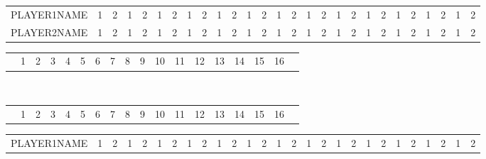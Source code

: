 \begin{table}
\begin{tabular}{p{5cm}|c|c|c|c|c|c|c|c|c|c|c|c|c|c|c|c|c|c|c|c|c|c|c|c|c|c|}
\cline{2-27}
PLAYER1NAME & \footnotesize 1 & \footnotesize 2 & \footnotesize 1 & \footnotesize 2 & \footnotesize 1 & \footnotesize 2 & \footnotesize 1 & \footnotesize 2 & \footnotesize 1 & \footnotesize 2 & \footnotesize 1 & \footnotesize 2 & \footnotesize 1 & \footnotesize 2 & \footnotesize 1 & \footnotesize 2 & \footnotesize 1 & \footnotesize 2 & \footnotesize 1 & \footnotesize 2 & \footnotesize 1 & \footnotesize 2 & \footnotesize 1 & \footnotesize 2 & \footnotesize 1 & \footnotesize 2 \\
\cline{1-27}
\cline{1-27}
PLAYER2NAME & \footnotesize 1 & \footnotesize 2 & \footnotesize 1 & \footnotesize 2 & \footnotesize 1 & \footnotesize 2 & \footnotesize 1 & \footnotesize 2 & \footnotesize 1 & \footnotesize 2 & \footnotesize 1 & \footnotesize 2 & \footnotesize 1 & \footnotesize 2 & \footnotesize 1 & \footnotesize 2 & \footnotesize 1 & \footnotesize 2 & \footnotesize 1 & \footnotesize 2 & \footnotesize 1 & \footnotesize 2 & \footnotesize 1 & \footnotesize 2 & \footnotesize 1 & \footnotesize 2 \\
\cline{2-27}
\end{tabular}
\begin{tabular}{p{5cm}|c|c|c|c|c|c!{\vrule width 2pt}c|c|c|c|c|c|c|c|c|c!{\vrule width 3pt}p{1cm}!{\vrule width 3pt}}
& 1 & 2 & 3 & 4 & 5 & 6 & 7 & 8 & 9 & 10 & 11 & 12 & 13 & 14 & 15 & 16 & \\
\end{tabular}
~\\
\begin{tabular}{p{5cm}|c|c|c|c|c|c!{\vrule width 2pt}c|c|c|c|c|c|c|c|c|c!{\vrule width 3pt}p{1cm}!{\vrule width 3pt}}
& 1 & 2 & 3 & 4 & 5 & 6 & 7 & 8 & 9 & 10 & 11 & 12 & 13 & 14 & 15 & 16 & \\
\end{tabular}
\begin{tabular}{p{5cm}|c|c|c|c|c|c|c|c|c|c|c|c|c|c|c|c|c|c|c|c|c|c|c|c|c|c|}
\cline{2-27}
PLAYER1NAME & \footnotesize 1 & \footnotesize 2 & \footnotesize 1 & \footnotesize 2 & \footnotesize 1 & \footnotesize 2 & \footnotesize 1 & \footnotesize 2 & \footnotesize 1 & \footnotesize 2 & \footnotesize 1 & \footnotesize 2 & \footnotesize 1 & \footnotesize 2 & \footnotesize 1 & \footnotesize 2 & \footnotesize 1 & \footnotesize 2 & \footnotesize 1 & \footnotesize 2 & \footnotesize 1 & \footnotesize 2 & \footnotesize 1 & \footnotesize 2 & \footnotesize 1 & \footnotesize 2 \\

\end{tabular}
\end{table}
